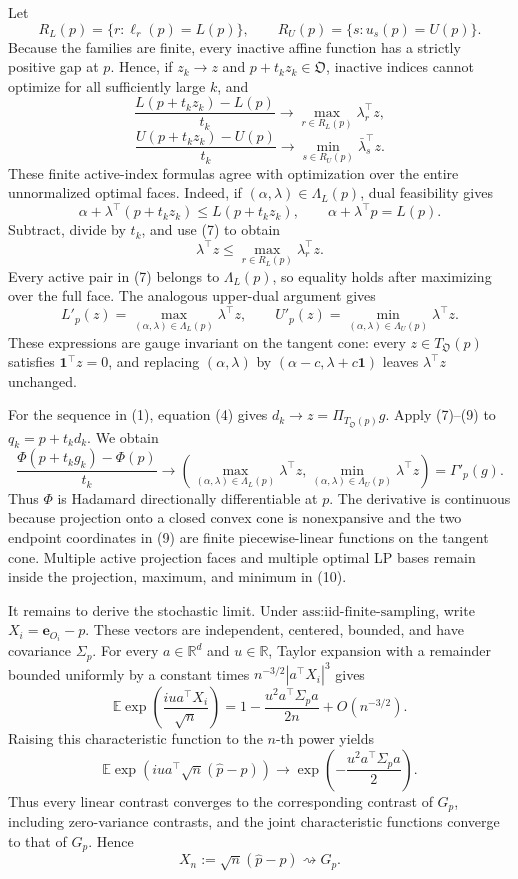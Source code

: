 Let
\[
R_L(p)=\{r:\ell_r(p)=L(p)\},
\qquad
R_U(p)=\{s:u_s(p)=U(p)\}.
\]
Because the families are finite, every inactive affine function has a strictly positive gap at \(p\).  Hence, if \(z_k\to z\) and \(p+t_kz_k\in\mathfrak O\), inactive indices cannot optimize for all sufficiently large \(k\), and
\[
\frac{L(p+t_kz_k)-L(p)}{t_k}
\longrightarrow\max_{r\in R_L(p)}\lambda_r^{\top}z,
\tag{7}
\]
\[
\frac{U(p+t_kz_k)-U(p)}{t_k}
\longrightarrow\min_{s\in R_U(p)}\bar\lambda_s^{\top}z.
\tag{8}
\]
These finite active-index formulas agree with optimization over the entire unnormalized optimal faces.  Indeed, if \((\alpha,\lambda)\in\Lambda_L(p)\), dual feasibility gives
\[
\alpha+\lambda^{\top}(p+t_kz_k)\leq L(p+t_kz_k),
\qquad
\alpha+\lambda^{\top}p=L(p).
\]
Subtract, divide by \(t_k\), and use (7) to obtain
\[
\lambda^{\top}z\leq\max_{r\in R_L(p)}\lambda_r^{\top}z.
\]
Every active pair in (7) belongs to \(\Lambda_L(p)\), so equality holds after maximizing over the full face.  The analogous upper-dual argument gives
\[
L'_p(z)=\max_{(\alpha,\lambda)\in\Lambda_L(p)}\lambda^{\top}z,
\qquad
U'_p(z)=\min_{(\alpha,\lambda)\in\Lambda_U(p)}\lambda^{\top}z.
\tag{9}
\]
These expressions are gauge invariant on the tangent cone: every \(z\in T_{\mathfrak O}(p)\) satisfies \(\mathbf 1^{\top}z=0\), and replacing \((\alpha,\lambda)\) by \((\alpha-c,\lambda+c\mathbf 1)\) leaves \(\lambda^{\top}z\) unchanged.

For the sequence in (1), equation (4) gives \(d_k\to z=\Pi_{T_{\mathfrak O}(p)}g\).  Apply (7)--(9) to \(q_k=p+t_kd_k\).  We obtain
\[
\frac{\Phi(p+t_kg_k)-\Phi(p)}{t_k}
\longrightarrow
\left(
\max_{(\alpha,\lambda)\in\Lambda_L(p)}\lambda^{\top}z,
\min_{(\alpha,\lambda)\in\Lambda_U(p)}\lambda^{\top}z
\right)
=\Gamma'_p(g).
\tag{10}
\]
Thus \(\Phi\) is Hadamard directionally differentiable at \(p\).  The derivative is continuous because projection onto a closed convex cone is nonexpansive and the two endpoint coordinates in (9) are finite piecewise-linear functions on the tangent cone.  Multiple active projection faces and multiple optimal LP bases remain inside the projection, maximum, and minimum in (10).

It remains to derive the stochastic limit.  Under \(\text{ass:iid-finite-sampling}\), write \(X_i=\mathbf e_{O_i}-p\).  These vectors are independent, centered, bounded, and have covariance \(\Sigma_p\).  For every \(a\in\mathbb R^d\) and \(u\in\mathbb R\), Taylor expansion with a remainder bounded uniformly by a constant times \(n^{-3/2}|a^{\top}X_i|^3\) gives
\[
\mathbb E\exp\!\left(\frac{iu a^{\top}X_i}{\sqrt n}\right)
=1-\frac{u^2a^{\top}\Sigma_pa}{2n}+O(n^{-3/2}).
\]
Raising this characteristic function to the \(n\)-th power yields
\[
\mathbb E\exp\!\left(iu a^{\top}\sqrt n(\widehat p-p)\right)
\longrightarrow\exp\!\left(-\frac{u^2a^{\top}\Sigma_pa}{2}\right).
\tag{11}
\]
Thus every linear contrast converges to the corresponding contrast of \(G_p\), including zero-variance contrasts, and the joint characteristic functions converge to that of \(G_p\).  Hence
\[
X_n:=\sqrt n(\widehat p-p)\rightsquigarrow G_p.
\tag{12}
\]

